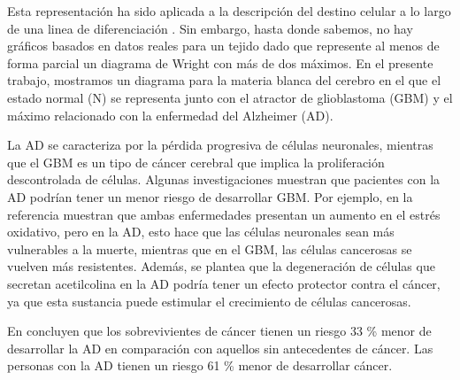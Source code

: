 Esta representación ha sido aplicada a la descripción del destino celular a lo largo de una linea de diferenciación \cite{casey2020theory}. Sin embargo, hasta donde sabemos, no hay gráficos basados en datos reales para un tejido dado que represente al menos de forma parcial un diagrama de Wright con más de dos máximos. En el presente trabajo, mostramos un diagrama para la materia blanca del cerebro en el que el estado normal (N) se representa junto con el atractor de glioblastoma (GBM) y el máximo relacionado con la enfermedad del Alzheimer (AD).

La AD se caracteriza por la pérdida progresiva de células neuronales, mientras que el GBM es un tipo de cáncer cerebral que implica la proliferación descontrolada de células. Algunas investigaciones muestran que pacientes con la AD podrían tener un menor riesgo de desarrollar GBM. Por ejemplo, en la referencia \cite{ou2012does} muestran que ambas enfermedades presentan un aumento en el estrés oxidativo, pero en la AD, esto hace que las células neuronales sean más vulnerables a la muerte, mientras que en el GBM, las células cancerosas se vuelven más resistentes. Además, se plantea que la degeneración de células que secretan acetilcolina en la AD podría tener un efecto protector contra el cáncer, ya que esta sustancia puede estimular el crecimiento de células cancerosas.

%

En \cite{Driver_2012} concluyen que los sobrevivientes de cáncer tienen un riesgo 33 \% menor de desarrollar la AD en comparación con aquellos sin antecedentes de cáncer. Las personas con la AD tienen un riesgo 61 \% menor de desarrollar cáncer.

